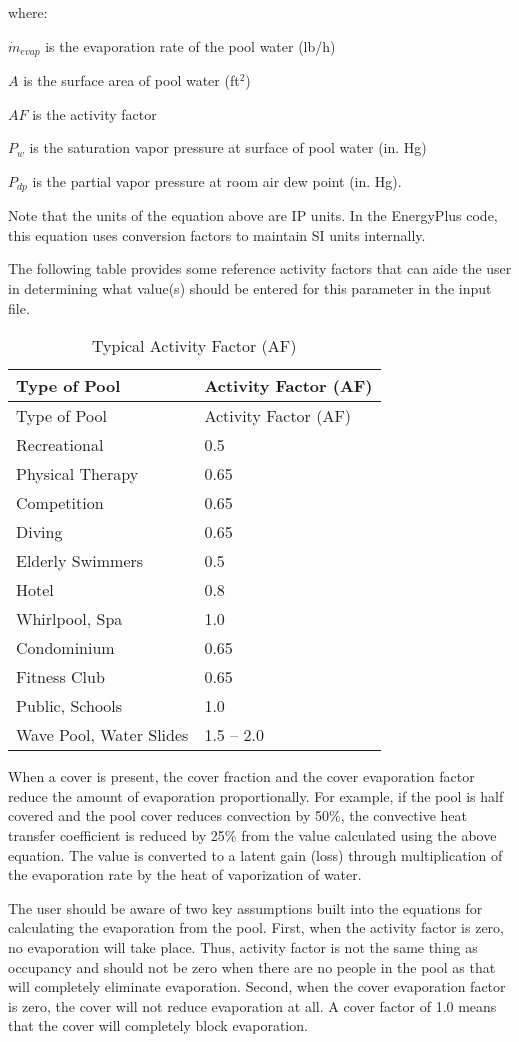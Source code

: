where:

\(\dot{m}_{evap}\) is the evaporation rate of the pool water (lb/h)

\(A\) is the surface area of pool water (ft\(^2\))

\(AF\) is the activity factor

\(P_w\) is the saturation vapor pressure at surface of pool water (in. Hg)

\(P_{dp}\) is the partial vapor pressure at room air dew point (in. Hg).

Note that the units of the equation above are IP units.  In the EnergyPlus code, this equation uses conversion factors to maintain SI units internally.

The following table provides some reference activity factors that can aide the user in determining what value(s) should be entered for this parameter in the input file.

\begin{longtable}[c]{@{}ll@{}}
\caption{Typical Activity Factor (AF) \label{table:typical-activity-factor-af}} \tabularnewline
\toprule 
Type of Pool & Activity Factor (AF) \tabularnewline
\midrule
\endfirsthead

\toprule 
Type of Pool & Activity Factor (AF) \tabularnewline
\midrule
\endhead

Recreational & 0.5 \tabularnewline
Physical Therapy & 0.65 \tabularnewline
Competition & 0.65 \tabularnewline
Diving & 0.65 \tabularnewline
Elderly Swimmers & 0.5 \tabularnewline
Hotel & 0.8 \tabularnewline
Whirlpool, Spa & 1.0 \tabularnewline
Condominium & 0.65 \tabularnewline
Fitness Club & 0.65 \tabularnewline
Public, Schools & 1.0 \tabularnewline
Wave Pool, Water Slides & 1.5 – 2.0 \tabularnewline
\bottomrule
\end{longtable}

When a cover is present, the cover fraction and the cover evaporation factor reduce the amount of evaporation proportionally. For example, if the pool is half covered and the pool cover reduces convection by 50\%, the convective heat transfer coefficient is reduced by 25\% from the value calculated using the above equation. The value is converted to a latent gain (loss) through multiplication of the evaporation rate by the heat of vaporization of water.

The user should be aware of two key assumptions built into the equations for calculating the evaporation from the pool.  First, when the activity factor is zero, no evaporation will take place.  Thus, activity factor is not the same thing as occupancy and should not be zero when there are no people in the pool as that will completely eliminate evaporation.  Second, when the cover evaporation factor is zero, the cover will not reduce evaporation at all.  A cover factor of 1.0 means that the cover will completely block evaporation.

